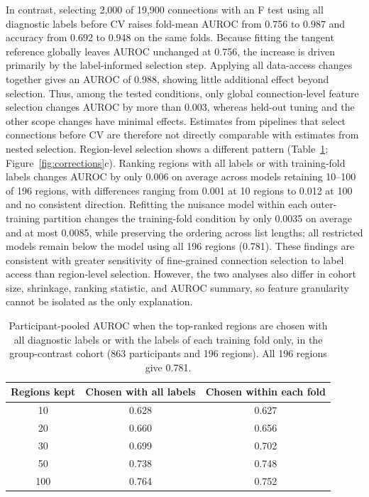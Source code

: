 In contrast, selecting 2,000 of 19,900 connections with an F test using all diagnostic labels before CV raises fold-mean AUROC from 0.756 to 0.987 and accuracy from 0.692 to 0.948 on the same folds. Because fitting the tangent reference globally leaves AUROC unchanged at 0.756, the increase is driven primarily by the label-informed selection step. Applying all data-access changes together gives an AUROC of 0.988, showing little additional effect beyond selection. Thus, among the tested conditions, only global connection-level feature selection changes AUROC by more than 0.003, whereas held-out tuning and the other scope changes have minimal effects. Estimates from pipelines that select connections before CV are therefore not directly comparable with estimates from nested selection. Region-level selection shows a different pattern (Table~\ref{tab:region-selection}; Figure~\ref{fig:corrections}c). Ranking regions with all labels or with training-fold labels changes AUROC by only 0.006 on average across models retaining 10--100 of 196 regions, with differences ranging from 0.001 at 10 regions to 0.012 at 100 and no consistent direction. Refitting the nuisance model within each outer-training partition changes the training-fold condition by only 0.0035 on average and at most 0.0085, while preserving the ordering across list lengths; all restricted models remain below the model using all 196 regions (0.781). These findings are consistent with greater sensitivity of fine-grained connection selection to label access than region-level selection. However, the two analyses also differ in cohort size, shrinkage, ranking statistic, and AUROC summary, so feature granularity cannot be isolated as the only explanation.

\begin{table}[t]
\centering
\caption{Participant-pooled AUROC when the top-ranked regions are chosen with all
diagnostic labels or with the labels of each training fold only, in the group-contrast
cohort (863 participants and 196 regions). All 196 regions give 0.781.}
\label{tab:region-selection}
\small
\begin{tabular}{@{}ccc@{}}
\toprule
Regions kept & Chosen with all labels & Chosen within each fold \\
\midrule
10 & 0.628 & 0.627 \\
20 & 0.660 & 0.656 \\
30 & 0.699 & 0.702 \\
50 & 0.738 & 0.748 \\
100 & 0.764 & 0.752 \\
\bottomrule
\end{tabular}
\end{table}

